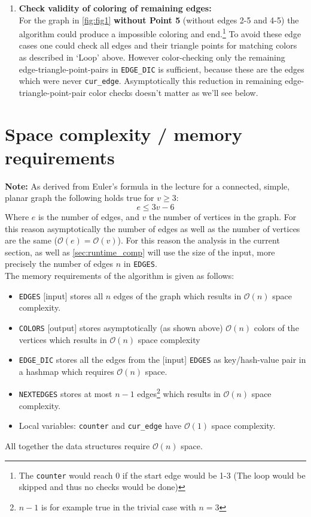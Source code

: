 \documentclass[english]{scrartcl}
\newcommand{\code}{\texttt}
\begin{document}
\begin{enumerate}
    \item \textbf{Check validity of coloring of remaining edges:}\\For the graph in \autoref{fig:fig1} \textbf{without Point 5} (without edges 2-5 and 4-5) the algorithm could produce a impossible coloring and end.\footnote{The \code{counter} would reach 0 if the start edge would be 1-3 (The loop would be skipped and thus no checks would be done)} To avoid these edge cases one could check all edges and their triangle points for matching colors as described in \enquote*{Loop} above. However color-checking only the remaining edge-triangle-point-pairs in \code{EDGE\_DIC} is sufficient, because these are the edges which were never \code{cur\_edge}. Asymptotically this reduction in remaining edge-triangle-point-pair color checks doesn't matter as we'll see below. 
\end{enumerate}


\section{Space complexity / memory requirements}
\label{sec:space_compl}
\textbf{Note:} As derived from Euler's formula in the lecture for a connected, simple, planar graph the following holds true for $v \geq 3$:
\begin{equation}
    \label{eq:euler}
    e \leq 3 v-6 
\end{equation}
Where $e$ is the number of edges, and $v$ the number of vertices in the graph. For this reason asymptotically the number of edges as well as the number of vertices are the same ($\mathcal{O}(e) = \mathcal{O}(v)$). 
For this reason the analysis in the current section, as well as \autoref{sec:runtime_comp} will use the size of the input, more precisely the number of edges $n$ in \code{EDGES}.\\
\newline
The memory requirements of the algorithm is given as follows:
\begin{itemize}
    \item \code{EDGES} [input] stores all $n$ edges of the graph which results in $\mathcal{O}(n)$ space complexity.
    \item \code{COLORS} [output] stores asymptotically (as shown above) $\mathcal{O}(n)$ colors of the vertices which results in $\mathcal{O}(n)$ space complexity
    \item \code{EDGE\_DIC} stores all the edges from the [input] \code{EDGES} as key/hash-value pair in a hashmap which requires $\mathcal{O}(n)$ space. 
    \item \code{NEXTEDGES} stores at most $n-1$ edges\footnote{$n-1$ is for example true in the trivial case with $n=3$} which results in $\mathcal{O}(n)$ space complexity.
    \item Local variables: \code{counter} and \code{cur\_edge} have $\mathcal{O}(1)$ space complexity.
\end{itemize}
All together the data structures require $\mathcal{O}(n)$ space. 
\end{document}
